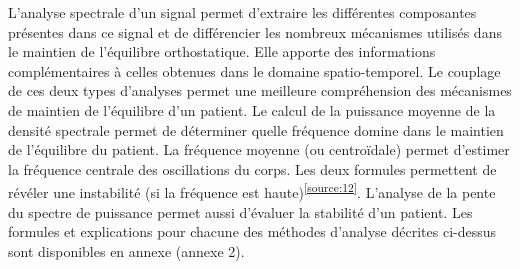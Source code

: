 L’analyse spectrale d’un signal permet d’extraire les différentes composantes présentes dans ce signal et de différencier les nombreux mécanismes utilisés dans le maintien de l’équilibre orthostatique. 
Elle apporte des informations complémentaires à celles obtenues dans le domaine spatio-temporel. 
Le couplage de ces deux types d’analyses permet une meilleure compréhension des mécanismes de maintien de l’équilibre d’un patient. 
Le calcul de la puissance moyenne de la densité spectrale permet de déterminer quelle fréquence domine dans le maintien de l’équilibre du patient. 
La fréquence moyenne (ou centroïdale) permet d’estimer la fréquence centrale des oscillations du corps. 
Les deux formules permettent de révéler une instabilité (si la fréquence est haute)\textsuperscript{\ref{source:12}}. 
L’analyse de la pente du spectre de puissance permet aussi d’évaluer la stabilité d’un patient.
Les formules et explications pour chacune des méthodes d’analyse décrites ci-dessus sont disponibles en annexe (annexe 2).

